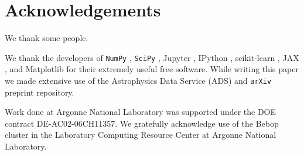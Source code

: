 \documentclass[numberedappendix,twocolumn,twocolappendix]{openjournal}
\begin{document}
\section*{Acknowledgements}
We thank some people.

We thank the developers of {\tt NumPy} \citep{numpy_ndarray}, {\tt SciPy} \citep{scipy}, Jupyter \citep{jupyter}, IPython \citep{ipython}, scikit-learn \citep{scikit_learn}, JAX \citep{jax2018github}, and Matplotlib \citep{matplotlib} for their extremely useful free software. While writing this paper we made extensive use of the Astrophysics Data Service (ADS) and {\tt arXiv} preprint repository.

Work done at Argonne National Laboratory was supported under the DOE contract DE-AC02-06CH11357. We gratefully acknowledge use of the Bebop cluster in the Laboratory Computing Resource Center at Argonne National Laboratory.




\appendix

\end{document}
